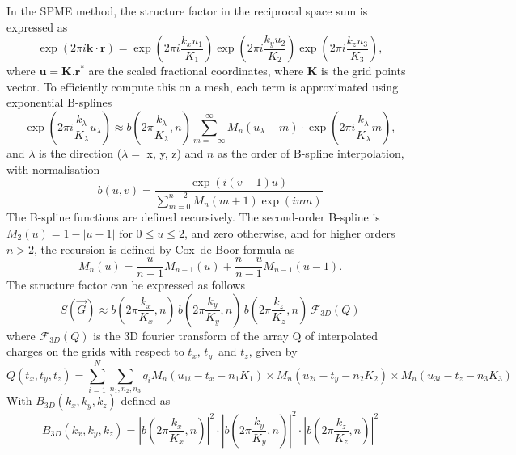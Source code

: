 In the SPME method, the structure factor in the reciprocal space sum is expressed as
\begin{equation}
\exp(2\pi i \mathbf{k} \cdot \mathbf{r}) =
\exp\left(2\pi i \frac{k_x u_1}{K_1} \right)
\exp\left(2\pi i \frac{k_y u_2}{K_2} \right)
\exp\left(2\pi i \frac{k_z u_3}{K_3} \right),
\end{equation}
where $\mathbf{u} = \mathbf{K}.\mathbf{r^*}$ are the scaled fractional coordinates, where $\mathbf{K}$ is the grid points vector. To efficiently compute this on a mesh, each term is approximated using exponential B-splines
\begin{equation}
    \exp\left(2\pi i \frac{k_\lambda}{K_\lambda} u_\lambda\right) \approx 
    b \left(2\pi \frac{k_\lambda}{K_\lambda},n\right) \sum_{m=-\infty}^{\infty} M_n(u_\lambda - m) 
    \cdot \exp\left(2\pi i \frac{k_\lambda}{K_\lambda} m\right),\label{eq:bspline}
\end{equation}
and $\lambda$ is the direction ($\lambda = $ x, y, z) and $n$ as the order of B-spline interpolation, with normalisation
\begin{equation}
    b(u,v) = \frac{\exp\left(i (v - 1) u\right)}
       {\sum_{m=0}^{n-2} M_n(m+1) \exp\left(i um\right)}
\end{equation}
The B-spline functions are defined recursively. The second-order B-spline is 
$M_2(u) = 
1 - |u - 1| \text{ for } 0 \le u \le 2$, and zero otherwise, and for higher orders \( n > 2 \), the recursion is defined by Cox–de Boor formula as
\begin{equation}
M_n(u) = \frac{u}{n-1} M_{n-1}(u) + \frac{n - u}{n - 1} M_{n-1}(u - 1).
\end{equation}
The structure factor can be expressed as follows
\begin{equation}
    S(\vec{G}) \approx b\left(2\pi \frac{k_x}{K_x},n\right)\,b\left(2\pi \frac{k_y}{K_y},n\right)\,b\left(2\pi \frac{k_z}{K_z},n\right) \, \mathcal{F}_{3D}(Q)
\end{equation}
where $\mathcal{F}_{3D}(Q)$ is the 3D fourier transform of the array Q of interpolated charges on the grids with respect to $t_x,\,t_y\,$ and $t_z$, given by
\begin{equation}
    Q(t_x, t_y, t_z) =  \sum_{i=1}^{N} \sum_{n_1, n_2, n_3} q_i M_n(u_{1i} - t_x - n_1 K_1) \times M_n(u_{2i} - t_y - n_2 K_2) \times M_n(u_{3i} - t_z - n_3 K_3)
\end{equation}
With $ B_{3D}(k_x, k_y, k_z)$ defined as $$ B_{3D}(k_x, k_y, k_z) = \left| b\left(2\pi \frac{k_x}{K_x},n\right) \right|^2 \cdot \left| b\left(2\pi \frac{k_y}{K_y},n\right) \right|^2 \cdot \left| b\left(2\pi \frac{k_z}{K_z},n\right) \right|^2$$
